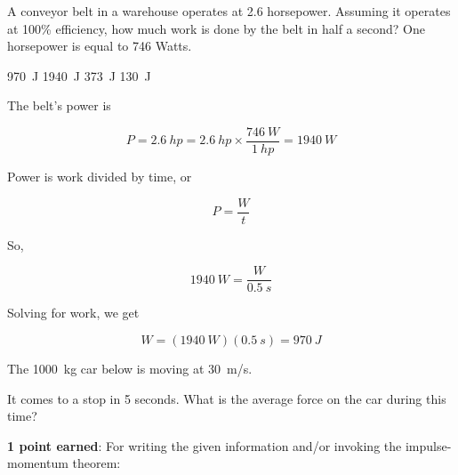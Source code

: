 \documentclass[answers]{exam}
\begin{document}
\begin{questions}
\question
A conveyor belt in a warehouse operates at 2.6 horsepower. Assuming it operates at 100\% efficiency, how much work is done by the belt in half a second? One horsepower is equal to 746 Watts. 

\begin{randomizeoneparchoices}
    \correctchoice \SI{970}{J}
    \choice \SI{1940}{J}
    \choice \SI{373}{J}
    \choice \SI{130}{J}
\end{randomizeoneparchoices}

\begin{solution}
The belt's power is

\begin{equation*}
    P = \SI{2.6}{hp} = \SI{2.6}{hp} \times \frac{\SI{746}{W}}{\SI{1}{hp}} = \SI{1940}{W}
\end{equation*}

Power is work divided by time, or

\begin{equation*}
    P = \frac{W}{t}
\end{equation*}

So,

\begin{equation*}
    \SI{1940}{W} = \frac{W}{\SI{0.5}{s}}
\end{equation*}

Solving for work, we get

\begin{equation*}
    W = (\SI{1940}{W})(\SI{0.5}{s}) = \boxed{\SI{970}{J}}
\end{equation*}
\end{solution}
\fi


\clearpage

\question[2]
The \SI{1000}{kg} car below is moving at \SI{30}{m/s}.


\begin{center}
\end{center}

It comes to a stop in 5 seconds.  What is the average force on the car during this time?

\begin{solutionorbox}[6cm]

\textbf{\color{red} 1 point earned}: For writing the given information and/or invoking the impulse-momentum theorem: \medskip


\end{solutionorbox}
\end{questions}
\end{document}
